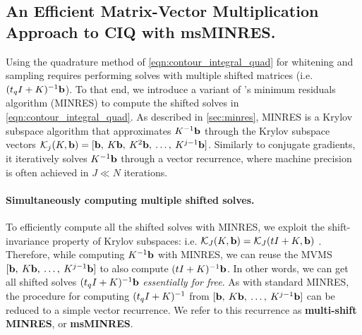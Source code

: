 \subsection{An Efficient Matrix-Vector Multiplication Approach to CIQ with msMINRES.}
%
Using the quadrature method of \cref{eqn:contour_integral_quad} for whitening and sampling requires performing solves with multiple shifted matrices
(i.e. $(t_q I + K )^{-1} \mathbf{b}$).
To that end,  we introduce a variant of \citet{paige1975solution}'s minimum residuals algorithm (MINRES) to compute the shifted solves in \cref{eqn:contour_integral_quad}.
As described in \cref{sec:minres}, MINRES is a Krylov subspace algorithm that approximates $K^{-1} \mathbf{b}$ through the Krylov subspace vectors $\mathcal{K}_j(K, \mathbf{b}) = [ \mathbf{b}, \: K \mathbf{b}, \: K^2 \mathbf{b}, \: \ldots, \: K^{j-1} \mathbf{b}]$.
Similarly to conjugate gradients, it iteratively solves $K^{-1} \mathbf{b}$ through a vector recurrence, where machine precision is often achieved in $J \ll N$ iterations.


\paragraph{Simultaneously computing multiple shifted solves.}
To efficiently compute all the shifted solves with MINRES, we exploit the shift-invariance property of Krylov subspaces: i.e. $\mathcal{K}_J(K, \mathbf{b}) = \mathcal{K}_J(t I +  K, \mathbf{b})$ \citep[e.g.][]{saad2003iterative}.
Therefore, while computing $K^{-1} \mathbf{b}$ with MINRES, we can reuse the MVMS $[\mathbf{b}, \: K \mathbf{b}, \: \ldots, \: K^{j-1} \mathbf{b}]$ to also compute $(t I + K)^{-1} \mathbf{b}$.
In other words, we can get all shifted solves $(t_q I + K)^{-1} \mathbf{b}$ \emph{essentially for free}.
As with standard MINRES, the procedure for computing $(t_q I + K)^{-1}$ from $[\mathbf{b}, \: K \mathbf{b}, \: \ldots, \: K^{j-1} \mathbf{b}]$ can be reduced to a simple vector recurrence.
We refer to this recurrence as {\bf multi-shift MINRES}, or {\bf msMINRES}.

